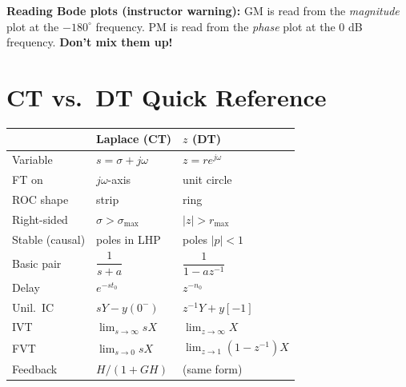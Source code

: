 \documentclass[11pt]{article}
\begin{document}
\noindent\textbf{Reading Bode plots (instructor warning):} GM is read from the \emph{magnitude} plot at the $-180^\circ$ frequency. PM is read from the \emph{phase} plot at the 0 dB frequency. \textbf{Don't mix them up!}

\section{CT vs.\ DT Quick Reference}
\begin{center}
\begin{tabular}{lll}
\toprule
 & Laplace (CT) & $z$ (DT) \\
\midrule
Variable & $s = \sigma + j\omega$ & $z = re^{j\omega}$ \\
FT on & $j\omega$-axis & unit circle \\
ROC shape & strip & ring \\
Right-sided & $\sigma > \sigma_\text{max}$ & $|z| > r_\text{max}$ \\
Stable (causal) & poles in LHP & poles $|p| < 1$ \\
Basic pair & $\dfrac{1}{s+a}$ & $\dfrac{1}{1-az^{-1}}$ \\
Delay & $e^{-s t_0}$ & $z^{-n_0}$ \\
Unil.\ IC & $sY - y(0^-)$ & $z^{-1}Y + y[-1]$ \\
IVT & $\lim_{s\to\infty} sX$ & $\lim_{z\to\infty} X$ \\
FVT & $\lim_{s\to 0} sX$ & $\lim_{z\to 1}(1 - z^{-1})X$ \\
Feedback & $H/(1+GH)$ & (same form) \\
\bottomrule
\end{tabular}
\end{center}
\end{document}
